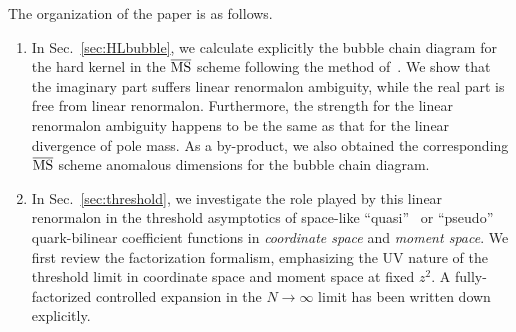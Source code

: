 \documentclass[a4paper,11pt]{article}
\begin{document}
The organization of the paper is as follows.
\begin{enumerate}
    \item In Sec.~\ref{sec:HLbubble}, we calculate explicitly the bubble chain diagram for the hard kernel in the $\overline{\rm MS}$ scheme following the method of~\cite{Palanques-Mestre:1983ogz,Beneke:1994sw,Beneke:1995pq,Scimemi:2016ffw}. We show that the imaginary part suffers linear renormalon ambiguity, while the real part is free from linear renormalon. Furthermore, the strength for the linear renormalon ambiguity happens to be the same as that for the linear divergence of pole mass. As a by-product, we also obtained the corresponding $\overline{\rm MS}$ scheme anomalous dimensions for the bubble chain diagram. 
    \item In Sec.~\ref{sec:threshold}, we investigate the role played by this linear renormalon in the threshold asymptotics of space-like ``quasi''~\cite{Ji:2013dva,Ji:2014gla} or ``pseudo''~\cite{Radyushkin:2017cyf,Radyushkin:2017lvu} quark-bilinear coefficient functions in {\it coordinate space} and {\it moment space}. We first review the factorization formalism,  emphasizing the UV nature of the threshold limit in coordinate space and moment space at fixed $z^2$. A fully-factorized controlled expansion in the $N\rightarrow \infty$ limit has been written down explicitly. 
    

\end{enumerate}
\end{document}
